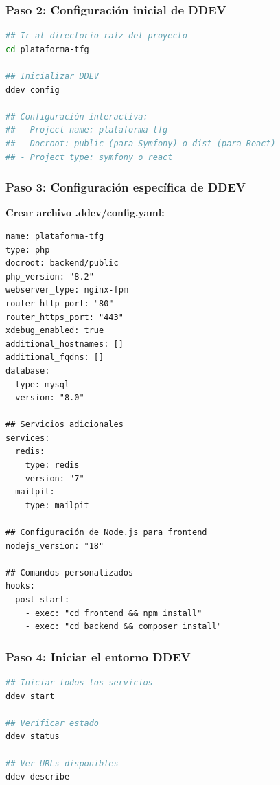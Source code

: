 \documentclass[12pt,a4paper,oneside]{report}
\begin{document}
\subsubsection{Paso 2: Configuración inicial de
DDEV}\label{paso-2-configuraciuxf3n-inicial-de-ddev}

\begin{lstlisting}[language=bash]
## Ir al directorio raíz del proyecto
cd plataforma-tfg

## Inicializar DDEV
ddev config

## Configuración interactiva:
## - Project name: plataforma-tfg
## - Docroot: public (para Symfony) o dist (para React)
## - Project type: symfony o react
\end{lstlisting}

\subsubsection{Paso 3: Configuración específica de
DDEV}\label{paso-3-configuraciuxf3n-especuxedfica-de-ddev}

\textbf{Crear archivo .ddev/config.yaml:}

\begin{lstlisting}
name: plataforma-tfg
type: php
docroot: backend/public
php_version: "8.2"
webserver_type: nginx-fpm
router_http_port: "80"
router_https_port: "443"
xdebug_enabled: true
additional_hostnames: []
additional_fqdns: []
database:
  type: mysql
  version: "8.0"
  
## Servicios adicionales
services:
  redis:
    type: redis
    version: "7"
  mailpit:
    type: mailpit

## Configuración de Node.js para frontend
nodejs_version: "18"

## Comandos personalizados
hooks:
  post-start:
    - exec: "cd frontend && npm install"
    - exec: "cd backend && composer install"
\end{lstlisting}

\subsubsection{Paso 4: Iniciar el entorno
DDEV}\label{paso-4-iniciar-el-entorno-ddev}

\begin{lstlisting}[language=bash]
## Iniciar todos los servicios
ddev start

## Verificar estado
ddev status

## Ver URLs disponibles
ddev describe
\end{lstlisting}
\end{document}
